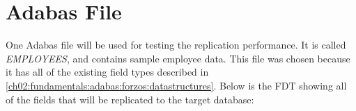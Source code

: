 

\section{Adabas File}
\label{ch05:methodology:adabasfile}
One Adabas file will be used for testing the replication performance. It is called \textit{EMPLOYEES}, and contains sample employee data. This file was chosen because it has all of the existing field types described in \ref{ch02:fundamentals:adabas:forzos:datastructures}. Below is the \ac{FDT} showing all of the fields that will be replicated to the target database:

